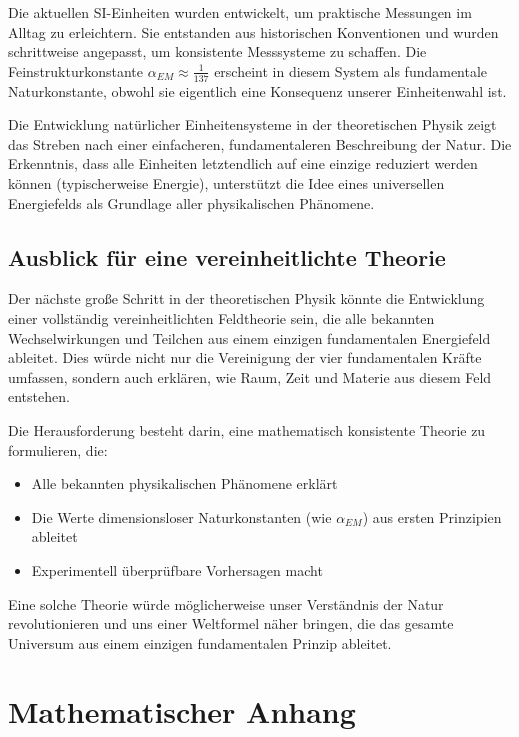 \documentclass[12pt,a4paper]{article}
\begin{document}
	Die aktuellen SI-Einheiten wurden entwickelt, um praktische Messungen im Alltag zu erleichtern. Sie entstanden aus historischen Konventionen und wurden schrittweise angepasst, um konsistente Messsysteme zu schaffen. Die Feinstrukturkonstante $\alpha_{EM} \approx \frac{1}{137}$ erscheint in diesem System als fundamentale Naturkonstante, obwohl sie eigentlich eine Konsequenz unserer Einheitenwahl ist.
	
	Die Entwicklung natürlicher Einheitensysteme in der theoretischen Physik zeigt das Streben nach einer einfacheren, fundamentaleren Beschreibung der Natur. Die Erkenntnis, dass alle Einheiten letztendlich auf eine einzige reduziert werden können (typischerweise Energie), unterstützt die Idee eines universellen Energiefelds als Grundlage aller physikalischen Phänomene.
	
	\subsection{Ausblick für eine vereinheitlichte Theorie}
	
	Der nächste große Schritt in der theoretischen Physik könnte die Entwicklung einer vollständig vereinheitlichten Feldtheorie sein, die alle bekannten Wechselwirkungen und Teilchen aus einem einzigen fundamentalen Energiefeld ableitet. Dies würde nicht nur die Vereinigung der vier fundamentalen Kräfte umfassen, sondern auch erklären, wie Raum, Zeit und Materie aus diesem Feld entstehen.
	
	Die Herausforderung besteht darin, eine mathematisch konsistente Theorie zu formulieren, die:
	
	\begin{itemize}
		\item Alle bekannten physikalischen Phänomene erklärt
		\item Die Werte dimensionsloser Naturkonstanten (wie $\alpha_{EM}$) aus ersten Prinzipien ableitet
		\item Experimentell überprüfbare Vorhersagen macht
	\end{itemize}
	
	Eine solche Theorie würde möglicherweise unser Verständnis der Natur revolutionieren und uns einer Weltformel näher bringen, die das gesamte Universum aus einem einzigen fundamentalen Prinzip ableitet.
	
	\section{Mathematischer Anhang}
	
\end{document}

